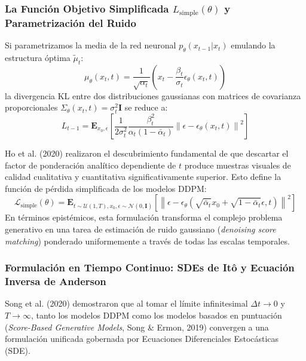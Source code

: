 \subsubsection{La Función Objetivo Simplificada $L_{\mathrm{simple}}(\theta)$ y Parametrización del Ruido}

Si parametrizamos la media de la red neuronal $p_\theta(x_{t-1}|x_t)$ emulando la estructura óptima $\tilde{\mu}_t$:
\begin{equation}
\mu_\theta(x_t, t) = \frac{1}{\sqrt{\alpha_t}} \left( x_t - \frac{\beta_t}{\sigma_t} \epsilon_\theta(x_t, t) \right)
\end{equation}
la divergencia KL entre dos distribuciones gaussianas con matrices de covarianza proporcionales $\Sigma_\theta(x_t, t) = \sigma_t^2 \mathbf{I}$ se reduce a:
\begin{equation}
L_{t-1} = \mathbf{E}_{x_0, \epsilon} \left[ \frac{1}{2 \sigma_t^2} \frac{\beta_t^2}{\alpha_t (1 - \bar{\alpha}_t)} \left\| \epsilon - \epsilon_\theta(x_t, t) \right\|^2 \right]
\end{equation}

Ho et al. (2020) realizaron el descubrimiento fundamental de que descartar el factor de ponderación analítico dependiente de $t$ produce muestras visuales de calidad cualitativa y cuantitativa significativamente superior. Esto define la función de pérdida simplificada de los modelos DDPM:
\begin{equation}
\mathcal{L}_{\mathrm{simple}}(\theta) = \mathbf{E}_{t \sim \mathcal{U}(1, T), x_0, \epsilon \sim \mathcal{N}(0, \mathbf{I})} \left[ \left\| \epsilon - \epsilon_\theta(\sqrt{\bar{\alpha}_t} x_0 + \sqrt{1 - \bar{\alpha}_t} \epsilon, t) \right\|^2 \right]
\end{equation}
En términos epistémicos, esta formulación transforma el complejo problema generativo en una tarea de estimación de ruido gaussiano (\textit{denoising score matching}) ponderado uniformemente a través de todas las escalas temporales.

\subsubsection{Formulación en Tiempo Continuo: SDEs de Itô y Ecuación Inversa de Anderson}

Song et al. (2020) demostraron que al tomar el límite infinitesimal $\Delta t \to 0$ y $T \to \infty$, tanto los modelos DDPM como los modelos basados en puntuación (\textit{Score-Based Generative Models}, Song \& Ermon, 2019) convergen a una formulación unificada gobernada por Ecuaciones Diferenciales Estocásticas (SDE).


